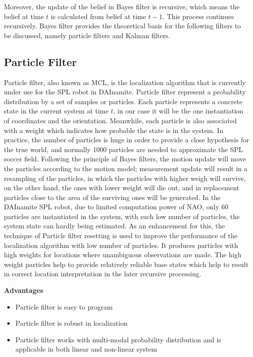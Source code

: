 Moreover, the update of the belief in Bayes filter is recursive, which means the belief at time $t$ is calculated from belief at time $t-1$. This process continues recursively. Bayes filter provides the theoretical basis for the following filters to be discussed, namely particle filters and Kalman filters. 

\subsection{Particle Filter}
Particle filter, also known as \gls{MCL}, is the localization algorithm that is currently under use for the \gls{SPL} robot in DAInamite. Particle filter represent a probability distribution by a set of samples or particles. Each particle represents a concrete state in the current system at time $t$, in our case it will be the one instantiation of coordinates and the orientation. Meanwhile, each particle is also associated with a weight which indicates how probable the state is in the system. In practice, the number of particles is huge in order to provide a close hypothesis for the true world, and normally 1000 particles are needed to approximate the \gls{SPL} soccer field. Following the principle of Bayes filters, the motion update will move the particles according to the motion model; measurement update will result in a resampling of the particles, in which the particles with higher weigh will survive, on the other hand, the ones with lower weight will die out, and in replacement particles close to the area of the surviving ones will be generated. In the DAInamite \gls{SPL} robot, due to limited computation power of NAO, only 60 particles are instantiated in the system, with such low number of particles, the system state can hardly being estimated. As an enhancement for this, the technique of Particle filter resetting is used to improve the performance of the localization algorithm with low number of particles. It produces particles with high weights for locations where unambiguous observations are made. The high weight particles help to provide relatively reliable base states which help to result in correct location interpretation in the later recursive processing. 

\noindent\textbf{Advantages}
\begin{itemize}
  \item  Particle filter is easy to program
  \item Particle filter is robust in localization 
  \item  Particle filter works with multi-modal probability distribution and is applicable in both linear and non-linear system
\end{itemize}

